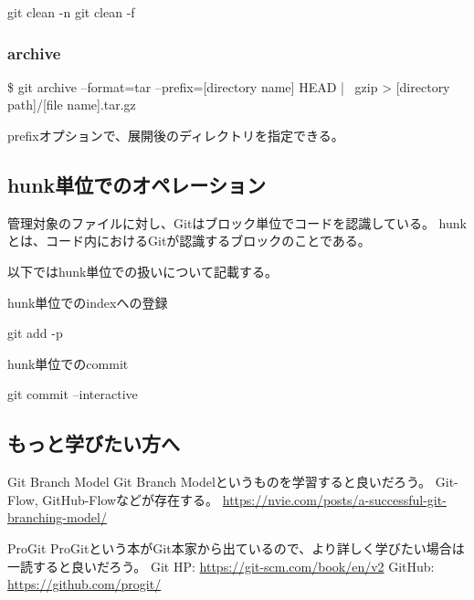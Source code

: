 \documentclass[10pt,a4j,openany,dvipdfmx]{jsarticle}
\begin{document}
\begin{commandshell}
git clean -n
git clean -f 
\end{commandshell}

\subsubsection{archive} %
\label{ssub:archive}

\$ git archive --format=tar --prefix=[directory name] HEAD | \
gzip > [directory path]/[file name].tar.gz

prefixオプションで、展開後のディレクトリを指定できる。

\subsection{hunk単位でのオペレーション} %
\label{sub:hunk単位でのオペレーション}

\begin{tcolorbox}[title=hunkとは, fonttitle=\bfseries]
管理対象のファイルに対し、Gitはブロック単位でコードを認識している。
hunkとは、コード内におけるGitが認識するブロックのことである。
\end{tcolorbox}

以下ではhunk単位での扱いについて記載する。

hunk単位でのindexへの登録
\begin{commandshell}
git add -p
\end{commandshell}

hunk単位でのcommit
\begin{commandshell}
git commit --interactive
\end{commandshell}


\subsection{もっと学びたい方へ} %
\label{sub:もっと学びたい方へ}


\begin{skybox}{Git Branch Model}
Git Branch Modelというものを学習すると良いだろう。
Git-Flow, GitHub-Flowなどが存在する。
\tcblower
\url{https://nvie.com/posts/a-successful-git-branching-model/}
\end{skybox}

\begin{redbox}{ProGit}
ProGitという本がGit本家から出ているので、より詳しく学びたい場合は一読すると良いだろう。
\tcblower
Git HP: \url{https://git-scm.com/book/en/v2}
GitHub: \url{https://github.com/progit/}
\end{redbox}




\end{document}
